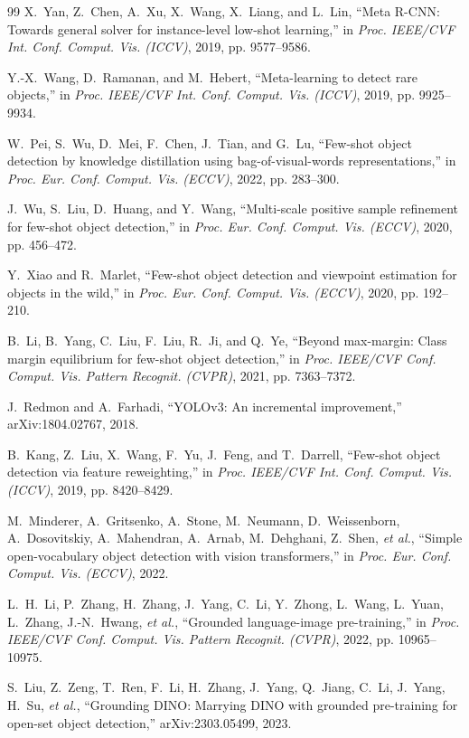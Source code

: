 \documentclass[zihao=5,a4paper,twocolumn]{ctexart}
\begin{document}
\begin{thebibliography}{99}
X.~Yan, Z.~Chen, A.~Xu, X.~Wang, X.~Liang, and L.~Lin,
``Meta R-CNN: Towards general solver for instance-level low-shot learning,''
in \emph{Proc. IEEE/CVF Int. Conf. Comput. Vis. (ICCV)}, 2019, pp. 9577--9586.

Y.-X.~Wang, D.~Ramanan, and M.~Hebert,
``Meta-learning to detect rare objects,''
in \emph{Proc. IEEE/CVF Int. Conf. Comput. Vis. (ICCV)}, 2019, pp. 9925--9934.

W.~Pei, S.~Wu, D.~Mei, F.~Chen, J.~Tian, and G.~Lu,
``Few-shot object detection by knowledge distillation using bag-of-visual-words representations,''
in \emph{Proc. Eur. Conf. Comput. Vis. (ECCV)}, 2022, pp. 283--300.

J.~Wu, S.~Liu, D.~Huang, and Y.~Wang,
``Multi-scale positive sample refinement for few-shot object detection,''
in \emph{Proc. Eur. Conf. Comput. Vis. (ECCV)}, 2020, pp. 456--472.

Y.~Xiao and R.~Marlet,
``Few-shot object detection and viewpoint estimation for objects in the wild,''
in \emph{Proc. Eur. Conf. Comput. Vis. (ECCV)}, 2020, pp. 192--210.

B.~Li, B.~Yang, C.~Liu, F.~Liu, R.~Ji, and Q.~Ye,
``Beyond max-margin: Class margin equilibrium for few-shot object detection,''
in \emph{Proc. IEEE/CVF Conf. Comput. Vis. Pattern Recognit. (CVPR)}, 2021, pp. 7363--7372.

J.~Redmon and A.~Farhadi,
``YOLOv3: An incremental improvement,''
arXiv:1804.02767, 2018.

B.~Kang, Z.~Liu, X.~Wang, F.~Yu, J.~Feng, and T.~Darrell,
``Few-shot object detection via feature reweighting,''
in \emph{Proc. IEEE/CVF Int. Conf. Comput. Vis. (ICCV)}, 2019, pp. 8420--8429.

M.~Minderer, A.~Gritsenko, A.~Stone, M.~Neumann, D.~Weissenborn, A.~Dosovitskiy, A.~Mahendran, A.~Arnab, M.~Dehghani, Z.~Shen, \emph{et al.},
``Simple open-vocabulary object detection with vision transformers,''
in \emph{Proc. Eur. Conf. Comput. Vis. (ECCV)}, 2022.

L.~H.~Li, P.~Zhang, H.~Zhang, J.~Yang, C.~Li, Y.~Zhong, L.~Wang, L.~Yuan, L.~Zhang, J.-N.~Hwang, \emph{et al.},
``Grounded language-image pre-training,''
in \emph{Proc. IEEE/CVF Conf. Comput. Vis. Pattern Recognit. (CVPR)}, 2022, pp. 10965--10975.

S.~Liu, Z.~Zeng, T.~Ren, F.~Li, H.~Zhang, J.~Yang, Q.~Jiang, C.~Li, J.~Yang, H.~Su, \emph{et al.},
``Grounding DINO: Marrying DINO with grounded pre-training for open-set object detection,''
arXiv:2303.05499, 2023.

\end{thebibliography}
\end{document}
